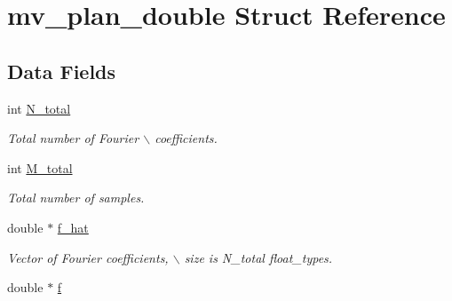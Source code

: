 \hypertarget{structmv__plan__double}{
\section{mv\_\-plan\_\-double Struct Reference}
\label{structmv__plan__double}
}
\subsection*{Data Fields}
\begin{CompactItemize}
\item 
\hypertarget{structmv__plan__double_f521def0cb92ad2800a60059710939c0}{
int \hyperlink{structmv__plan__double_f521def0cb92ad2800a60059710939c0}{N\_\-total}}
\label{structmv__plan__double_f521def0cb92ad2800a60059710939c0}

\begin{CompactList}\small\item\em Total number of Fourier $\backslash$ coefficients. \item\end{CompactList}\item 
\hypertarget{structmv__plan__double_cb6e92bc1595298d215fb238165d668b}{
int \hyperlink{structmv__plan__double_cb6e92bc1595298d215fb238165d668b}{M\_\-total}}
\label{structmv__plan__double_cb6e92bc1595298d215fb238165d668b}

\begin{CompactList}\small\item\em Total number of samples. \item\end{CompactList}\item 
\hypertarget{structmv__plan__double_871668d0764246c81328303734d1d81a}{
double $\ast$ \hyperlink{structmv__plan__double_871668d0764246c81328303734d1d81a}{f\_\-hat}}
\label{structmv__plan__double_871668d0764246c81328303734d1d81a}

\begin{CompactList}\small\item\em Vector of Fourier coefficients, $\backslash$ size is N\_\-total float\_\-types. \item\end{CompactList}\item 
\hypertarget{structmv__plan__double_d1128d690a2bb5f2aab921a78b092bf8}{
double $\ast$ \hyperlink{structmv__plan__double_d1128d690a2bb5f2aab921a78b092bf8}{f}}
\label{structmv__plan__double_d1128d690a2bb5f2aab921a78b092bf8}


\end{CompactItemize}
